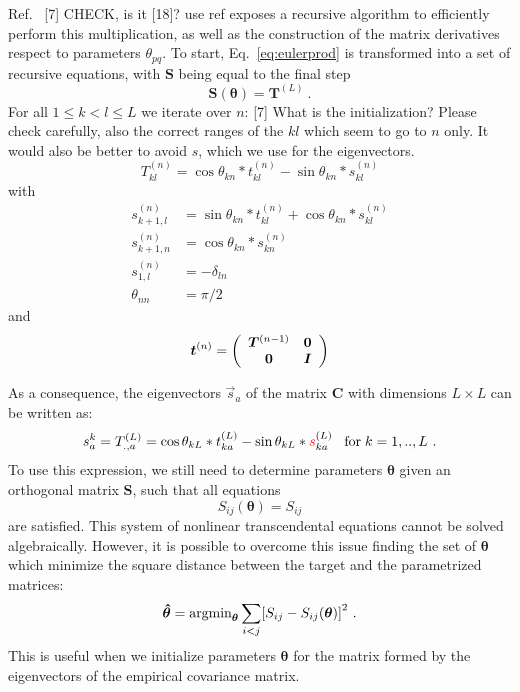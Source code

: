 \documentclass[preprint,amsmath,amssymb,superscriptaddress,showpacs,pre]{revtex4-1}
\let\originalleft\left
\let\originalright\right
\renewcommand{\left}{\mathopen{}\mathclose\bgroup\originalleft}
\renewcommand{\right}{\aftergroup\egroup\originalright}
\begin{document}
Ref.~{\color{red} [7] CHECK, is it [18]? use ref} exposes a recursive algorithm to efficiently perform this multiplication, as well as the   construction of the matrix derivatives respect to parameters $\theta_{pq}$. To start, Eq.~\eqref{eq:eulerprod} is transformed into a set of recursive equations, with $\bm S$ being equal to the final step
\begin{equation}
\bm S(\bm \theta)=\bm T^{(L)} \ .
\end{equation}
For all $1\leq k < l\leq L$ we iterate over $n$: {\color{red} [7] What is the initialization? Please check carefully, also the correct ranges of the $kl$ which seem to go to $n$ only. It would also be better to avoid $s$, which we use for the eigenvectors.}
\begin{equation}
    T^{(n)}_{kl}=\cos\theta_{kn} * t^{(n)}_{kl}-\sin\theta_{kn}* s^{(n)}_{kl}
\end{equation}
with
\begin{equation}
    \begin{split}
        s^{(n)}_{k+1,l}&=\sin\theta_{kn} * t^{(n)}_{kl}+\cos\theta_{kn}*s^{(n)}_{kl}\\
        s^{(n)}_{k+1,n}&=\cos\theta_{kn}*s^{(n)}_{kn}\\
        s^{(n)}_{1,l}&=-\delta_{ln}\\
        \theta_{nn}&=\pi/2
    \end{split}
\end{equation}
and
\begin{equation} 
\bm t^{(n)} =  \left(
\begin{array}{cc}
\bm T^{(n-1)} & \bm 0  \\
\bm 0 &  \bm I
\end{array}
\right)
\end{equation}

As a consequence, the eigenvectors $\vec{s}_a$ of the matrix $\bm C$ with dimensions $L\times L$ can be written as:
\begin{equation}
s^{k}_a=T^{(L)}_{.,a}=\cos\theta_{kL} * t^{(L)}_{ka}-\sin\theta_{kL}* {\color{red} s}^{(L)}_{ka} \;\;\; \text{for} \;k=1,..,L \ .
\end{equation}
To use this expression, we still need to determine parameters $\bm \theta$  given an orthogonal matrix $\bm S$, such that all equations
\begin{equation}
    S_{ij}(\bm \theta)=S_{ij}
\end{equation}
are satisfied. This system of nonlinear transcendental equations  cannot be solved algebraically. However, it is possible to overcome this issue finding the set of $\bm \theta$ which minimize the square distance between the target and the parametrized matrices: 
\begin{equation}
 {\bm{\hat \theta}} = \text{argmin}_{\bm \theta} \sum_{i<j}\left[ S_{ij}-S_{ij}(\bm \theta)\right] ^2 \ .
\end{equation}
This is useful when we initialize parameters $\bm \theta$ for the matrix formed by the eigenvectors of the empirical covariance matrix.
\end{document}
